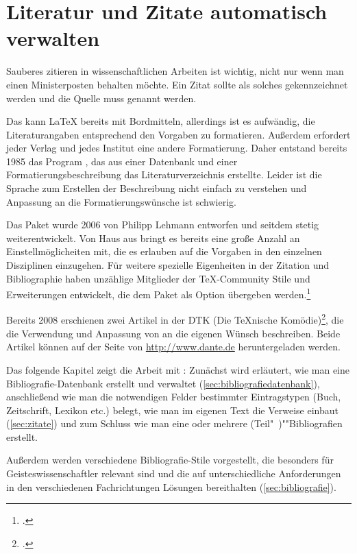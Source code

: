 \chapter{Literatur und Zitate automatisch verwalten}
\label{biblatex}

\noindent Sauberes zitieren in wissenschaftlichen Arbeiten ist wichtig,
nicht nur wenn man einen Ministerposten behalten möchte.
Ein Zitat sollte als solches gekennzeichnet werden und die Quelle muss genannt werden.

Das kann \LaTeX{} bereits mit Bordmitteln, 
allerdings ist es aufwändig,
die Literaturangaben entsprechend den Vorgaben zu formatieren.
Außerdem erfordert jeder Verlag und jedes Institut eine andere Formatierung.
Daher entstand bereits 1985 das Program \BibTeX,
das aus einer Datenbank und einer Formatierungsbeschreibung das Literaturverzeichnis erstellte.
Leider ist die Sprache zum Erstellen der Beschreibung nicht einfach zu verstehen
und Anpassung an die Formatierungswünsche ist schwierig.

Das Paket \biblatex{} wurde 2006 %
von Philipp Lehmann entworfen und seitdem stetig weiterentwickelt. 
Von Haus aus bringt es bereits eine große Anzahl an Einstellmöglicheiten mit, 
die es erlauben auf die Vorgaben in den einzelnen Disziplinen einzugehen. 
Für weitere spezielle Eigenheiten in der Zitation und Bibliographie haben unzählige Mitglieder der \TeX -Community Stile und Erweiterungen entwickelt,
die dem  Paket als Option übergeben werden.\footcite{voss:bibliografien}

Bereits 2008 erschienen zwei Artikel in der DTK (Die TeXnische Komödie)\footcite{wassenhoven:dtk2008/2,wassenhoven:dtk2008/4}, 
die die Verwendung und Anpassung von \biblatex{} an die eigenen Wünsch beschreiben.
Beide Artikel können auf der Seite von \url{http://www.dante.de} heruntergeladen werden.

Das folgende Kapitel zeigt die Arbeit mit \biblatex: 
Zunächst wird erläutert, wie man eine Bibliografie-Datenbank erstellt und verwaltet (\cref{sec:bibliografiedatenbank}),
anschließend wie man die notwendigen Felder bestimmter Eintragstypen (Buch, Zeitschrift, Lexikon etc.) belegt, 
wie man im eigenen Text die Verweise einbaut (\cref{sec:zitate}) und
zum Schluss wie man eine oder mehrere (Teil"~)""Bibliografien erstellt.

Außerdem werden verschiedene Bibliografie-Stile vorgestellt,
die besonders für Geisteswissenschaftler relevant sind und die auf unterschiedliche Anforderungen in den verschiedenen Fachrichtungen Lösungen bereithalten (\cref{sec:bibliografie}).

